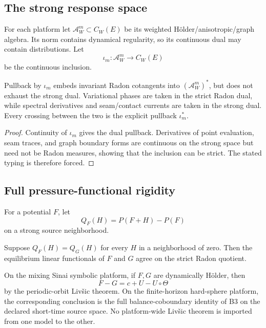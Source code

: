 \subsection{The strong response space}

For each platform let \(\mathscr A_W^m\subset C_W(E)\) be its weighted
H\"older/anisotropic/graph algebra.  Its norm contains dynamical regularity,
so its continuous dual may contain distributions.  Let
\[
 \iota_m:\mathscr A_W^m\longrightarrow C_W(E)
\]
be the continuous inclusion.

\begin{proposition}
\label{prop:r14-c2-two-topology}
Pullback by \(\iota_m\) embeds invariant Radon cotangents into
\((\mathscr A_W^m)^*\), but does not exhaust the strong dual.
Variational phases are taken in the strict Radon dual, while spectral
derivatives and seam/contact currents are taken in the strong dual.  Every
crossing between the two is the explicit pullback \(\iota_m^*\).
\end{proposition}

\begin{proof}
Continuity of \(\iota_m\) gives the dual pullback.  Derivatives of point
evaluation, seam traces, and graph boundary forms are continuous on the
strong space but need not be Radon measures, showing that the inclusion can
be strict.  The stated typing is therefore forced.
\end{proof}

\subsection{Full pressure-functional rigidity}

For a potential \(F\), let
\[
 Q_F(H)=P(F+H)-P(F)
\]
on a strong source neighborhood.

\begin{theorem}
\label{thm:r14-c2-rigidity}
Suppose \(Q_F(H)=Q_G(H)\) for every \(H\) in a neighborhood of zero.
Then the equilibrium linear functionals of \(F\) and \(G\) agree on the
strict Radon quotient.

On the mixing Sinai symbolic platform, if \(F,G\) are dynamically H\"older,
then
\[
 F-G=c+U-U\circ\Theta
\]
by the periodic-orbit Liv\v{s}ic theorem.  On the finite-horizon hard-sphere
platform, the corresponding conclusion is the full balance-coboundary
identity of B3 on the declared short-time source space.  No platform-wide
Liv\v{s}ic theorem is imported from one model to the other.
\end{theorem}

